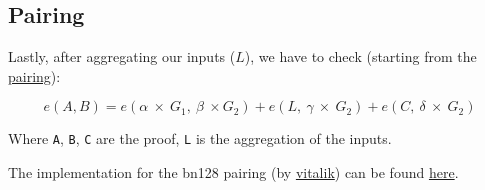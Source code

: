 \documentclass{article}
\begin{document}
\subsection{Pairing}


Lastly, after aggregating our inputs (\(L\)), we have to check (starting from the \href{https://xn--2-umb.com/22/pairings/index.html}{pairing}):

\[ e(A, B) = e(\alpha \ \times \ G_1, \ \beta \ \times G_2) + e(L, \ \gamma \ \times \ G_2) + e(C, \ \delta \ \times \ G_2)\]

Where \texttt{A}, \texttt{B}, \texttt{C} are the proof, \texttt{L} is the aggregation of the inputs.

The implementation for the bn128 pairing (by \href{https://vitalik.ca}{vitalik}) can be found \href{https://github.com/ethereum/py_pairing/blob/master/py_ecc/bn128/bn128_pairing.py#L68}{here}.
\end{document}
